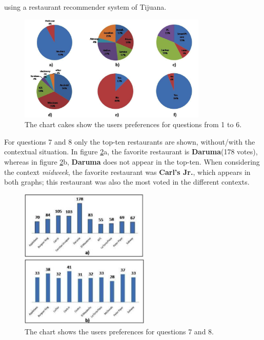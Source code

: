 using a restaurant recommender system of Tijuana.
\begin{figure}
\captionsetup{justification=centering,margin=2cm,font=footnotesize}
\centering
\setlength\fboxsep{0pt}
\includegraphics[width=0.8\textwidth]{img/cakes.png}
\caption{The chart cakes show the users preferences for questions from 1 to 6.}
\label{fig:cakeschart}     
\end{figure}
For questions 7 and 8 only the top-ten restaurants are shown,
without/with the contextual situation. In figure \ref{fig:barschart}a,
the favorite restaurant is \textbf{Daruma}(178 votes),  whereas in
figure \ref{fig:barschart}b, \textbf{Daruma} does not appear in the
top-ten. When considering the context \textit{midweek}, the favorite
restaurant was \textbf{Carl's Jr.}, which appears in both graphs; this
restaurant was also the most voted in the different contexts.
\begin{figure}
\captionsetup{justification=centering,margin=2cm,font=footnotesize}
\centering
\setlength\fboxsep{0pt}
\includegraphics[width=0.55\textwidth]{img/bars.png}
\caption{The chart shows the users preferences for questions 7 and 8.}
\label{fig:barschart}     
\end{figure}
